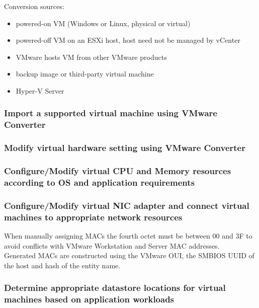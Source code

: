 Conversion sources:

\begin{itemize}
\item powered-on VM (Windows or Linux, physical or virtual)
\item powered-off VM on an ESXi host, host need not be managed by vCenter
\item VMware hosts VM from other VMware products
\item backup image or third-party virtual machine
\item Hyper-V Server
\end{itemize}

\subsubsection{Import a supported virtual machine using VMware Converter}

\subsubsection{Modify virtual hardware setting using VMware Converter}

\subsubsection{Configure/Modify virtual CPU and Memory resources according to OS and application requirements}

\subsubsection{Configure/Modify virtual NIC adapter and connect virtual machines to appropriate network resources}

When manually assigning MACs the fourth octet must be between 00 and 3F to
avoid conflicts with VMware Workstation and Server MAC addresses.\\

Generated MACs are constructed using the VMware OUI, the SMBIOS UUID of the
host and hash of the entity name.

\subsubsection{Determine appropriate datastore locations for virtual machines based on application workloads}
